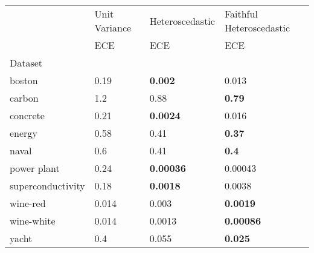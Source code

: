 \begin{tabular}{l|l|l|l}
\toprule
 & Unit Variance & Heteroscedastic & Faithful Heteroscedastic \\
 & ECE & ECE & ECE \\
Dataset &  &  &  \\
\midrule
boston & 0.19 & \bfseries 0.002 & 0.013 \\
carbon & 1.2 & 0.88 & \bfseries 0.79 \\
concrete & 0.21 & \bfseries 0.0024 & 0.016 \\
energy & 0.58 & 0.41 & \bfseries 0.37 \\
naval & 0.6 & 0.41 & \bfseries 0.4 \\
power plant & 0.24 & \bfseries 0.00036 & 0.00043 \\
superconductivity & 0.18 & \bfseries 0.0018 & 0.0038 \\
wine-red & 0.014 & 0.003 & \bfseries 0.0019 \\
wine-white & 0.014 & 0.0013 & \bfseries 0.00086 \\
yacht & 0.4 & 0.055 & \bfseries 0.025 \\
\bottomrule
\end{tabular}
